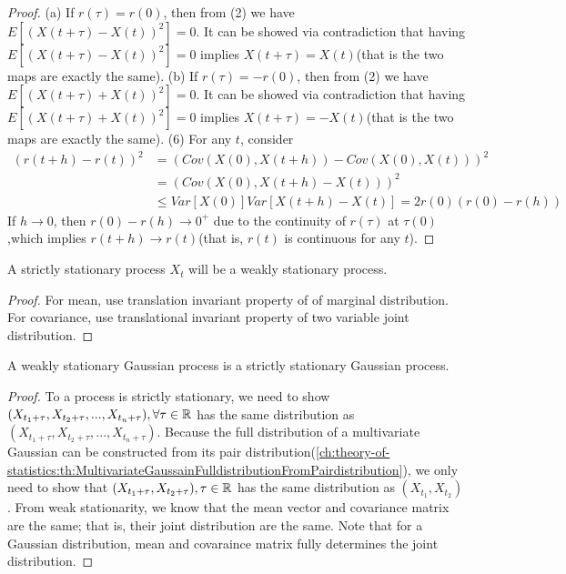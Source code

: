 \begin{refsection}
\begin{proof}
	(a) If $r(\tau)=r(0)$, then from (2) we have $E[(X(t+\tau)-X(t))^2] = 0$. It can be showed via contradiction that having $E[(X(t+\tau)-X(t))^2] = 0$ implies $X(t+\tau) = X(t)$(that is the two maps are exactly the same).
	(b) If $r(\tau)=-r(0)$, then from (2) we have $E[(X(t+\tau)+X(t))^2] = 0$. It can be showed via contradiction that having $E[(X(t+\tau)+X(t))^2] = 0$ implies $X(t+\tau) = -X(t)$(that is the two maps are exactly the same). 
	(6) For any $t$, consider
	\begin{align*}
	(r(t+h) - r(t))^2 &= (Cov(X(0),X(t+h)) - Cov(X(0),X(t)))^2 \\
	&= (Cov(X(0),X(t+h) - X(t)))^2 \\
	&\leq Var[X(0)]Var[X(t+h) - X(t)] = 2r(0)(r(0) - r(h))
	\end{align*}
	If $h\to 0$, then $r(0) - r(h)\to 0^+$ due to the continuity of $r(\tau)$ at $\tau(0)$,which implies $r(t+h)\to r(t)$(that is, $r(t)$ is continuous for any $t$).
\end{proof}

\begin{lemma}
	A strictly stationary process $X_t$ will be a weakly stationary process.
\end{lemma}
\begin{proof}
	For mean, use translation invariant property of of marginal distribution. For covariance, use translational invariant property of two variable joint distribution.
\end{proof}


\begin{lemma}\label{ch:theory-of-stochastic-process:weaklystationaryGaussianisstationary}A weakly stationary Gaussian process is a strictly stationary Gaussian process.
\end{lemma}
\begin{proof}
	To a process is strictly stationary, we need to show $(X_{t_1+\tau},X_{t_2+\tau},...,X_{t_n+\tau}),\forall \tau \in \mathbb{R}$ has the same distribution as 	$(X_{t_1+\tau},X_{t_2+\tau},...,X_{t_n+\tau})$. Because the full distribution of a multivariate Gaussian can be constructed from its pair distribution(\autoref{ch:theory-of-statistics:th:MultivariateGaussainFulldistributionFromPairdistribution}), we only need to show that $(X_{t_1+\tau},X_{t_2+\tau}),\tau \in \mathbb{R}$ has the same distribution as $(X_{t_1},X_{t_2})$. From weak stationarity, we know that the mean vector and covariance matrix are the same; that is, their joint distribution are the same.
	Note that for a Gaussian distribution, mean and covaraince matrix fully determines the joint distribution.
\end{proof}




\end{refsection}
